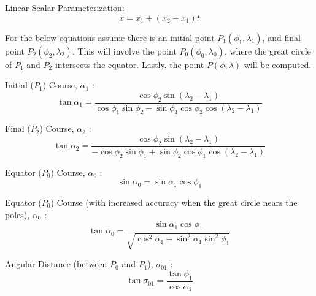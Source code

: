 \documentclass{article}
\begin{document}
Linear Scalar Parameterization:
\begin{equation}
    \label{linear_scalar_parameterization}
    x = x_1 + \left(x_2 - x_1\right)t
\end{equation}

For the below equations assume there is an 
initial point $P_1\left(\phi_1, \lambda_1\right)$,
and final point $P_2\left(\phi_2, \lambda_2\right)$.
This will involve the point $P_0\left(\phi_0, \lambda_0\right)$,
where the great circle of $P_1$ and $P_2$ intersects the equator.
Lastly, the point $P\left(\phi, \lambda\right)$ will be computed.

Initial ($P_1$) Course, $\alpha_1$ 
\cite[Course]{wikipedia_Great-circle_navigation}:
\begin{equation}
    \tan{\alpha_1} = \frac{
        \cos{\phi_2} \sin{\left(\lambda_2 - \lambda_1\right)}
    }{
        \cos{\phi_1} \sin{\phi_2} - 
            \sin{\phi_1}\cos{\phi_2}
                \cos{\left(\lambda_2 - \lambda_1\right)}
    }
\end{equation}

Final ($P_2$) Course, $\alpha_2$
\cite[Course]{wikipedia_Great-circle_navigation}:
\begin{equation}
    \tan{\alpha_2} = \frac{
        \cos{\phi_2} \sin{\left(\lambda_2 - \lambda_1\right)}
    }{
        -\cos{\phi_2} \sin{\phi_1} + 
            \sin{\phi_2}\cos{\phi_1}
                \cos{\left(\lambda_2 - \lambda_1\right)}
    }
\end{equation}

Equator ($P_0$) Course, $\alpha_0$
\cite[Finding way-points]{wikipedia_Great-circle_navigation}:
\begin{equation}
    \sin{\alpha_0} = \sin{\alpha_1} \cos{\phi_1}
\end{equation}

Equator ($P_0$) Course (with increased accuracy when the
great circle nears the poles), $\alpha_0$
\cite[Finding way-points]{wikipedia_Great-circle_navigation}:
\begin{equation}
    \tan{\alpha_0} = \frac{
        \sin{\alpha_1} \cos{\phi_1}
    }{
        \sqrt{\cos^2 {\alpha_1} + \sin^2 {\alpha_1} \sin^2 {\phi_1}}
    }
\end{equation}

Angular Distance (between $P_0$ and $P_1$), $\sigma_{01}$
\cite[Finding way-points]{wikipedia_Great-circle_navigation}:
\begin{equation}
    \tan{\sigma_{01}} = \frac{
        \tan{\phi_1}
    }{
        \cos{\alpha_1}
    }
\end{equation}
\end{document}
